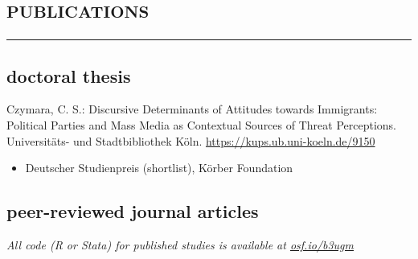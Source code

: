 \documentclass[11pt, a4paper]{article}
\newcommand{\years}[1]{\marginnote{~~#1}}
\begin{document}
\section*{\textsc{publications}}
\vskip-20pt{\noindent\rule{\textwidth}{1pt}}
\subsection*{doctoral thesis}
\years{2018}Czymara, C. S.: Discursive Determinants of Attitudes towards Immigrants: Political Parties and Mass Media as Contextual Sources of Threat Perceptions. Universitäts- und Stadtbibliothek Köln. \href{https://kups.ub.uni-koeln.de/9150}{https://kups.ub.uni-koeln.de/9150}
\begin{itemize}[nolistsep]
	\item Deutscher Studienpreis (shortlist), Körber Foundation
\end{itemize}
\hspace{1em}
\subsection*{peer-reviewed journal articles}
\textit{All code (R or Stata) for published studies is available at \href{https://osf.io/b3ugm}{osf.io/b3ugm}}\\
\end{document}
